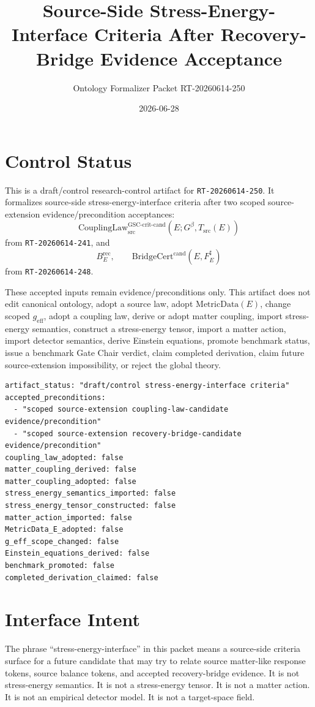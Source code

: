 \documentclass[11pt]{article}
\title{Source-Side Stress-Energy-Interface Criteria After Recovery-Bridge Evidence Acceptance}
\author{Ontology Formalizer Packet RT-20260614-250}
\date{2026-06-28}
\newcommand{\Gbeta}{G^\beta}
\newcommand{\MetricData}{\mathrm{MetricData}}
\newcommand{\geff}{g_{\mathrm{eff}}}
\newcommand{\CouplingLawCrit}{\mathrm{CouplingLaw}_{\mathrm{src}}^{\mathrm{GSC\mbox{-}crit\mbox{-}cand}}}
\newcommand{\BridgeCertCand}{\mathrm{BridgeCert}^{\mathrm{cand}}}
\newcommand{\BErec}{B_E^{\mathrm{rec}}}
\begin{document}
\maketitle

\section{Control Status}

This is a draft/control research-control artifact for
\texttt{RT-20260614-250}. It formalizes source-side
stress-energy-interface criteria after two scoped source-extension
evidence/precondition acceptances:
\[
  \CouplingLawCrit(E;\Gbeta,T_{\mathrm{src}}(E))
\]
from \texttt{RT-20260614-241}, and
\[
  \BErec,\qquad \BridgeCertCand(E,F_E^\sharp)
\]
from \texttt{RT-20260614-248}.

These accepted inputs remain evidence/preconditions only. This artifact does
not edit canonical ontology, adopt a source law, adopt \(\MetricData(E)\),
change scoped \(\geff\), adopt a coupling law, derive or adopt matter
coupling, import stress-energy semantics, construct a stress-energy tensor,
import a matter action, import detector semantics, derive Einstein equations,
promote benchmark status, issue a benchmark Gate Chair verdict, claim
completed derivation, claim future source-extension impossibility, or reject
the global theory.

\begin{verbatim}
artifact_status: "draft/control stress-energy-interface criteria"
accepted_preconditions:
  - "scoped source-extension coupling-law-candidate evidence/precondition"
  - "scoped source-extension recovery-bridge-candidate evidence/precondition"
coupling_law_adopted: false
matter_coupling_derived: false
matter_coupling_adopted: false
stress_energy_semantics_imported: false
stress_energy_tensor_constructed: false
matter_action_imported: false
MetricData_E_adopted: false
g_eff_scope_changed: false
Einstein_equations_derived: false
benchmark_promoted: false
completed_derivation_claimed: false
\end{verbatim}

\section{Interface Intent}

The phrase ``stress-energy-interface'' in this packet means a source-side
criteria surface for a future candidate that may try to relate source
matter-like response tokens, source balance tokens, and accepted
recovery-bridge evidence. It is not stress-energy semantics. It is not a
stress-energy tensor. It is not a matter action. It is not an empirical
detector model. It is not a target-space field.
\end{document}
